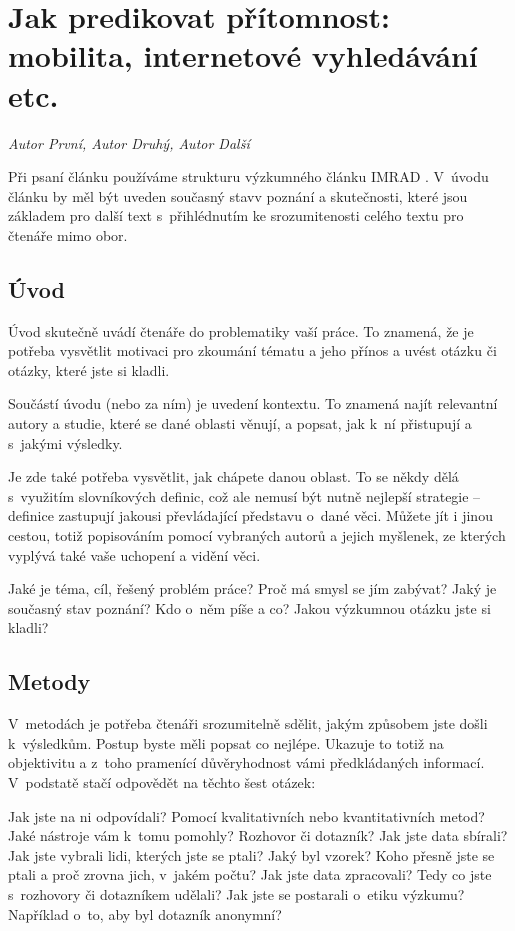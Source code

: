 
\chapter{Jak predikovat přítomnost: mobilita, internetové vyhledávání etc.}
\label{Predikce_pritomnosti}

\textit{Autor První, Autor Druhý, Autor Další}
\vspace{15mm}

   Při psaní článku používáme strukturu výzkumného článku IMRAD \cite{tulinska}. V~úvodu článku by měl být uveden současný stavv poznání \cite{colu92} a skutečnosti, které jsou základem pro další text \cite{phil99} s~přihlédnutím ke srozumitenosti celého textu pro čtenáře mimo obor.


\section*{Úvod} 

Úvod skutečně uvádí čtenáře do problematiky vaší práce. To znamená, že je potřeba vysvětlit motivaci pro zkoumání tématu a jeho přínos a uvést otázku či otázky, které jste si kladli.  

Součástí úvodu (nebo za ním) je uvedení kontextu. To znamená najít relevantní autory a studie, které se dané oblasti věnují, a popsat, jak k~ní přistupují a s~jakými výsledky.  

Je zde také potřeba vysvětlit, jak chápete danou oblast. To se někdy dělá s~využitím slovníkových definic, což ale nemusí být nutně nejlepší strategie – definice zastupují jakousi převládající představu o~dané věci. Můžete jít i jinou cestou, totiž popisováním pomocí vybraných autorů a jejich myšlenek, ze kterých vyplývá také vaše uchopení a vidění věci. 

    Jaké je téma, cíl, řešený problém práce? Proč má smysl se jím zabývat? 
    Jaký je současný stav poznání? Kdo o~něm píše a co? 
    Jakou výzkumnou otázku jste si kladli? 

\section*{Metody} 

V~metodách je potřeba čtenáři srozumitelně sdělit, jakým způsobem jste došli k~výsledkům. Postup byste měli popsat co nejlépe. Ukazuje to totiž na objektivitu a z~toho pramenící důvěryhodnost vámi předkládaných informací. V~podstatě stačí odpovědět na těchto šest otázek: 

    Jak jste na ni odpovídali? Pomocí kvalitativních nebo kvantitativních metod? 
    Jaké nástroje vám k~tomu pomohly? Rozhovor či dotazník?
    Jak jste data sbírali? Jak jste vybrali lidi, kterých jste se ptali? 
    Jaký byl vzorek? Koho přesně jste se ptali a proč zrovna jich, v~jakém počtu? 
    Jak jste data zpracovali? Tedy co jste s~rozhovory či dotazníkem udělali? 
    Jak jste se postarali o~etiku výzkumu? Například o~to, aby byl dotazník anonymní? 

